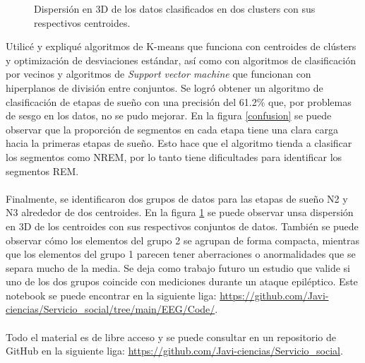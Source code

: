 \documentclass[11pt,letterpaper]{article}
\begin{document}
\begin{justify}
\begin{figure}[H]
\begin{minipage}{.48\linewidth}
\caption{\footnotesize{Dispersión en 3D de los datos clasificados en dos clusters con sus respectivos centroides.}}
\label{disp}
\end{minipage}
\end{figure}
Utilicé y expliqué algoritmos de K-means que funciona con centroides de clústers y optimización de desviaciones estándar, así como con algoritmos de clasificación por vecinos y algoritmos de \textit{Support vector machine} que funcionan con hiperplanos de división entre conjuntos. Se logró obtener un algoritmo de clasificación de etapas de sueño con una precisión del 61.2\% que, por problemas de sesgo en los datos, no se pudo mejorar. En la figura \ref{confusion} se puede observar que la proporción de segmentos en cada etapa tiene una clara carga hacia la primeras etapas de sueño. Esto hace que el algoritmo tienda a clasificar los segmentos como NREM, por lo tanto tiene dificultades para identificar los segmentos REM. \\
\hfill \\
Finalmente, se identificaron dos grupos de datos para las etapas de sueño N2 y N3 alrededor de dos centroides. En la figura \ref{disp} se puede observar unsa dispersión en 3D de los centroides con sus respectivos conjuntos de datos. También se puede observar cómo los elementos del grupo 2 se agrupan de forma compacta, mientras que los elementos del grupo 1 parecen tener aberraciones o anormalidades que se separa mucho de la media. Se deja como trabajo futuro un estudio que valide si uno de los dos grupos coincide con mediciones durante un ataque epiléptico. Este notebook se puede encontrar en la siguiente liga: \href{https://github.com/Javi-ciencias/Servicio\_social/tree/main/EEG/Code/}{https://github.com/Javi-ciencias/Servicio\_social/tree/main/EEG/Code/}. \\
 \hfill \\
Todo el material es de libre acceso y se puede consultar en un repositorio de GitHub en la siguiente liga: \href{https://github.com/Javi-ciencias/Servicio\_social}{https://github.com/Javi-ciencias/Servicio\_social}. \\
\end{justify}
\hfill \\
\end{document}
